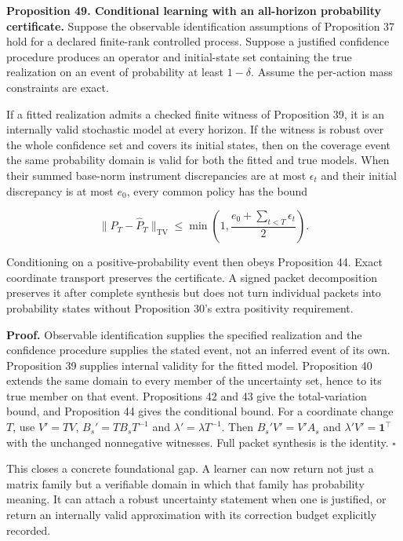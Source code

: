 \documentclass[11pt,letterpaper]{article}
\begin{document}
\textbf{Proposition 49. Conditional learning with an all-horizon
probability certificate.} Suppose the observable identification
assumptions of Proposition 37 hold for a declared finite-rank controlled
process. Suppose a justified confidence procedure produces an operator
and initial-state set containing the true realization on an event of
probability at least \(1-\delta\). Assume the per-action mass
constraints are exact.

If a fitted realization admits a checked finite witness of Proposition
39, it is an internally valid stochastic model at every horizon. If the
witness is robust over the whole confidence set and covers its initial
states, then on the coverage event the same probability domain is valid
for both the fitted and true models. When their summed base-norm
instrument discrepancies are at most \(\epsilon_t\) and their initial
discrepancy is at most \(e_0\), every common policy has the bound

\[
\|P_T-\widehat P_T\|_{\mathrm{TV}}
\leq\min\left(1,\frac{e_0+\sum_{t<T}\epsilon_t}{2}\right).
\]

Conditioning on a positive-probability event then obeys Proposition 44.
Exact coordinate transport preserves the certificate. A signed packet
decomposition preserves it after complete synthesis but does not turn
individual packets into probability states without Proposition 30's
extra positivity requirement.

\textbf{Proof.} Observable identification supplies the specified
realization and the confidence procedure supplies the stated event, not
an inferred event of its own. Proposition 39 supplies internal validity
for the fitted model. Proposition 40 extends the same domain to every
member of the uncertainty set, hence to its true member on that event.
Propositions 42 and 43 give the total-variation bound, and Proposition
44 gives the conditional bound. For a coordinate change \(T\), use
\(V'=TV\), \(B_s'=TB_sT^{-1}\) and \(\lambda'=\lambda T^{-1}\). Then
\(B_s'V'=V'A_s\) and \(\lambda'V'=\mathbf1^\top\) with the unchanged
nonnegative witnesses. Full packet synthesis is the identity.
\(\square\)

This closes a concrete foundational gap. A learner can now return not
just a matrix family but a verifiable domain in which that family has
probability meaning. It can attach a robust uncertainty statement when
one is justified, or return an internally valid approximation with its
correction budget explicitly recorded.
\end{document}
